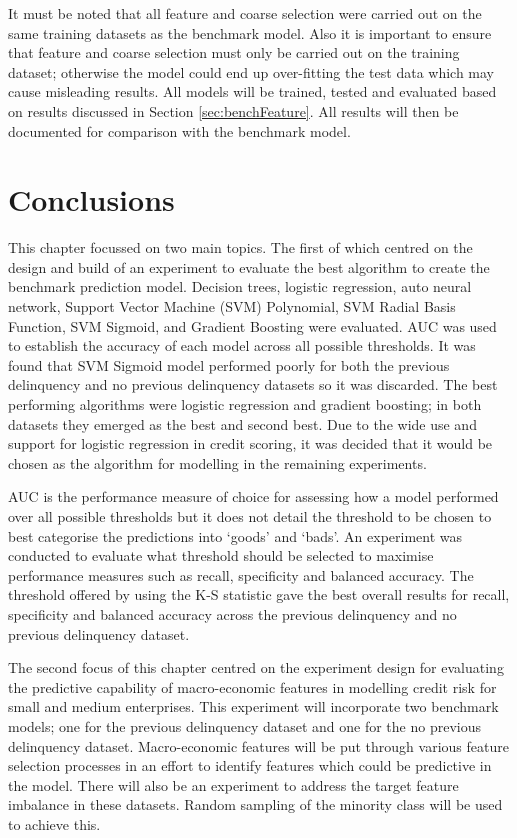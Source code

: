 It must be noted that all feature and coarse selection were carried out on the same training datasets as the benchmark model. Also it is important to ensure that feature and coarse selection must only be carried out on the training dataset; otherwise the model could end up over-fitting the test data which may cause misleading results. All models will be trained, tested and evaluated based on results discussed in Section \ref{sec:benchFeature}. All results will then be documented for comparison with the benchmark model. 


\section{Conclusions}

This chapter focussed on two main topics. The first of which centred on the design and build of an experiment to evaluate the best algorithm to create the benchmark prediction model. Decision trees, logistic regression, auto neural network, Support Vector Machine (SVM) Polynomial, SVM Radial Basis Function, SVM Sigmoid, and Gradient Boosting were evaluated. AUC was used to 
establish the accuracy of each model across all possible thresholds. It was found that SVM Sigmoid model performed poorly for both the previous delinquency and no previous delinquency datasets so it was discarded. The best performing algorithms were logistic regression and gradient boosting; in both datasets they emerged as the best and second best. Due to the wide use and support for logistic regression in credit scoring, it was decided that it would be chosen as the algorithm for modelling in the remaining experiments. 

AUC is the performance measure of choice for assessing how a model performed over all possible thresholds but it does not detail the threshold to be chosen to best categorise the predictions into `goods' and `bads'. An experiment was conducted to evaluate what threshold should be selected to maximise performance measures such as recall, specificity and balanced accuracy. The threshold offered by using the K-S statistic gave the best overall results for recall, specificity and balanced accuracy across the previous delinquency and no previous delinquency dataset.

The second focus of this chapter centred on the experiment design for evaluating the predictive capability of macro-economic features in modelling credit risk for small and medium enterprises. This experiment will incorporate two benchmark models; one for the previous delinquency dataset and one for the no previous delinquency dataset. Macro-economic features will be put through various feature selection processes in an effort to identify features which could be predictive in the model. There will also be an experiment to address the target feature imbalance in these datasets. Random sampling of the minority class will be used to achieve this.
